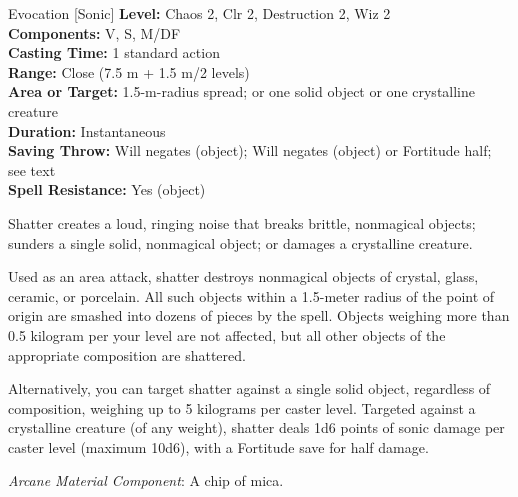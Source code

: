 {Evocation [Sonic]}
{
	\textbf{Level:}
	Chaos 2, Clr 2, Destruction 2, Wiz 2\\
	\textbf{Components:}
	V, S, M/DF\\
	\textbf{Casting Time:}
	1 standard action\\
	\textbf{Range:}
	Close (7.5 m + 1.5 m/2 levels)\\
	\textbf{Area or Target:}
	1.5-m-radius spread; or one solid object or one crystalline creature\\
	\textbf{Duration:}
	Instantaneous\\
	\textbf{Saving Throw:}
	Will negates (object); Will negates (object) or Fortitude half; see text\\
	\textbf{Spell Resistance:}
	Yes (object)\\
}
{
	Shatter creates a loud, ringing noise that breaks brittle, nonmagical objects; sunders a single solid, nonmagical object; or damages a crystalline creature.

	Used as an area attack, shatter destroys nonmagical objects of crystal, glass, ceramic, or porcelain. All such objects within a 1.5-meter radius of the point of origin are smashed into dozens of pieces by the spell. Objects weighing more than 0.5 kilogram per your level are not affected, but all other objects of the appropriate composition are shattered.

	Alternatively, you can target shatter against a single solid object, regardless of composition, weighing up to 5 kilograms per caster level. Targeted against a crystalline creature (of any weight), shatter deals 1d6 points of sonic damage per caster level (maximum 10d6), with a Fortitude save for half damage.

	\textit{Arcane Material Component}:
	A chip of mica.

}

